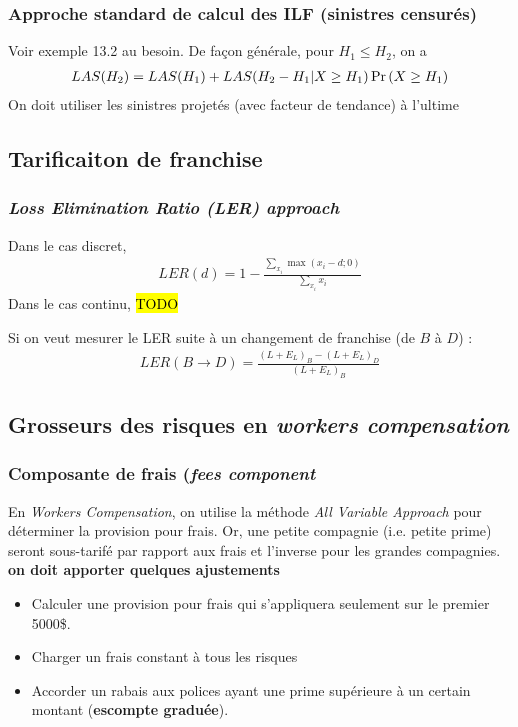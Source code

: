 \subsubsection{Approche standard de calcul des ILF (sinistres censurés)}
Voir exemple 13.2 au besoin. De façon générale, pour $H_1 \leq H_2$, on a
\begin{align*}
LAS(H_2) = LAS(H_1) + LAS(H_2 - H_1 | X \geq H_1) \Pr \left( X \geq H_1 \right)
\end{align*}
On doit utiliser les sinistres projetés (avec facteur de tendance) à l'ultime

\subsection{Tarificaiton de franchise}

\subsubsection{\textit{Loss Elimination Ratio (LER) approach}}
Dans le cas discret,
\begin{align*}
LER(d) = 1 - \frac{\sum_{x_i} \max (x_i - d ; 0)}{\sum_{x_i} x_i}
\end{align*}
Dans le cas continu,
\hl{TODO}

Si on veut mesurer le LER suite à un changement de franchise (de $B$ à $D$) : 
\begin{align*}
LER(B \rightarrow D) = \frac{(L + E_L)_B - (L+E_L)_D}{(L+E_L)_B}
\end{align*}

\subsection{Grosseurs des risques en \textit{workers compensation}}

\subsubsection{Composante de frais (\textit{fees component}} En \textit{Workers Compensation}, on utilise la méthode \textit{All Variable Approach} pour déterminer la provision pour frais. Or, une petite compagnie (i.e. petite prime) seront sous-tarifé par rapport aux frais et l'inverse pour les grandes compagnies. \textbf{on doit apporter quelques ajustements}
\begin{itemize}
\item Calculer une provision pour frais qui s'appliquera seulement sur le premier 5000\$.
\item Charger un frais constant à tous les risques
\item Accorder un rabais aux polices ayant une prime supérieure à un certain montant (\textbf{escompte graduée}).
\end{itemize}

